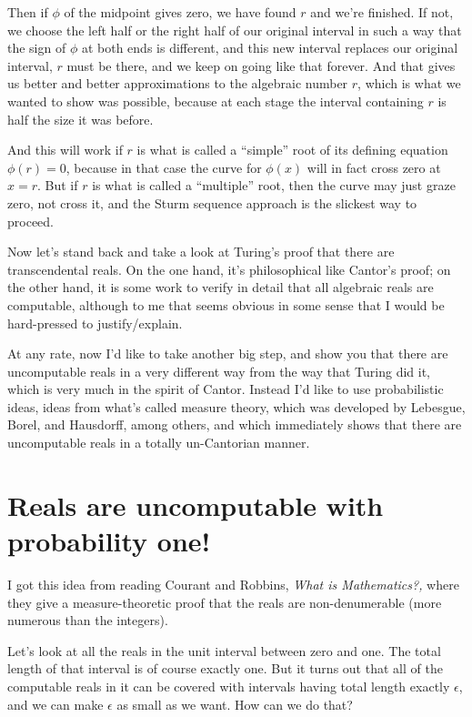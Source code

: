 \documentclass[12pt]{book}
\begin{document}
Then if $\phi$ of the midpoint gives zero, we have found $r$ and we're finished.
If not, we choose the left half or the right half of our original interval in such
a way that the sign of $\phi$ at both ends is different, and this new interval
replaces our original interval, $r$ must be there, and we keep on going like that forever.
And that gives us better and better approximations to the algebraic number $r$,
which is what
we wanted to show was possible,
because at each stage the interval containing $r$ is half the size it was before.
 
And this will work if $r$ is what is called a ``simple'' root of its defining equation $\phi(r) = 0$,
because in that case the curve for $\phi(x)$ will in fact cross zero at $x = r$.
But if $r$ is what is called a ``multiple'' root, then the curve may just graze zero, not cross it,
and the Sturm sequence approach is the slickest way to proceed.
 
Now let's stand back and take a look at Turing's proof that there are transcendental reals.
On the one hand, it's philosophical like Cantor's proof; on the other hand, it is some
work to verify in detail that all algebraic reals are computable, although to me that
seems obvious in some sense that I would be hard-pressed to justify/explain.
 
At any rate, now I'd like to take another big step, and show you that there are
uncomputable reals in a very different way from the way that Turing did it, which is very 
much in the spirit of Cantor.  Instead I'd like to use probabilistic ideas, ideas
from what's called measure theory, which was developed by Lebesgue, Borel, and Hausdorff,
among others, and which immediately shows that there are uncomputable reals in a totally
un-Cantorian manner. 

\section*{Reals are uncomputable with probability one!}

I got this idea from reading Courant and Robbins, 
\emph{What is Mathematics?,}
where they give a measure-theoretic
proof that the reals are non-denumerable (more numerous than the integers).
 
Let's look at all the reals in the unit interval between zero and one.
The total length of that interval is of course exactly one.
But it turns out that all of the computable reals in it can be covered with
intervals having total length exactly $\epsilon$, and we can make $\epsilon$ as small as
we want. How can we do that?
 
\end{document}
